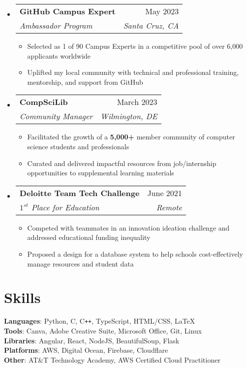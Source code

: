 \documentclass[letterpaper,11pt]{article}
\makeatletter
\newcommand{\resumeItem}[1]{
  \item\small{
    {#1 \vspace{-2pt}}
  }
}
\newcommand{\resumeSubheading}[4]{
  \vspace{-2pt}\item
    \begin{tabular*}{0.97\textwidth}[t]{l@{\extracolsep{\fill}}r}
      \textbf{#1} & #2 \\
      \textit{\small#3} & \textit{\small #4} \\
    \end{tabular*}\vspace{-7pt}
}
\newcommand{\resumeSubHeadingListStart}{\begin{itemize}[leftmargin=0.15in, label={}]}
\newcommand{\resumeSubHeadingListEnd}{\end{itemize}}
\newcommand{\resumeItemListStart}{\begin{itemize}}
\newcommand{\resumeItemListEnd}{\end{itemize}\vspace{-5pt}}
\makeatother
\begin{document}
\resumeSubHeadingListStart
\resumeSubheading{GitHub Campus Expert}{May 2023}{Ambassador Program}{Santa Cruz, CA}
\resumeItemListStart
\resumeItem{Selected as 1 of 90 Campus Experts in a competitive pool of over 6,000 applicants worldwide}
\resumeItem{Uplifted my local community with technical and professional training, mentorship, and support from GitHub}
\resumeItemListEnd

\resumeSubheading{CompSciLib}{March 2023}{Community Manager}{Wilmington, DE}
\resumeItemListStart
\resumeItem{Facilitated the growth of a \textbf{5,000+} member community of computer science students and professionals}
\resumeItem{Curated and delivered impactful resources from job/internship opportunities to supplemental learning materials}
\resumeItemListEnd

\resumeSubheading{Deloitte Team Tech Challenge}{June 2021}{$1^{st}$ Place for Education}{Remote}
\resumeItemListStart
\resumeItem{Competed with teammates in an innovation ideation challenge and addressed educational funding inequality}
\resumeItem{Proposed a design for a database system to help schools cost-effectively manage resources and student data}
\resumeItemListEnd


\resumeSubHeadingListEnd
\vspace{-10pt}

\section{Skills}
\begin{itemize}[leftmargin=0.15in, label={}]
	\small{\item{
		            \textbf{Languages}{: Python, C, C\texttt{++}, TypeScript, HTML/CSS, \LaTeX} \\
		            \textbf{Tools}{: Canva, Adobe Creative Suite, Microsoft Office, Git, Linux} \\
		            \textbf{Libraries}{: Angular, React, NodeJS, BeautifulSoup, Flask} \\
		            \textbf{Platforms}{: AWS, Digital Ocean, Firebase, Cloudflare} \\
		            \textbf{Other}{: AT\&T Technology Academy, AWS Certified Cloud Practitioner} \\
		      }}
\end{itemize}
\end{document}
